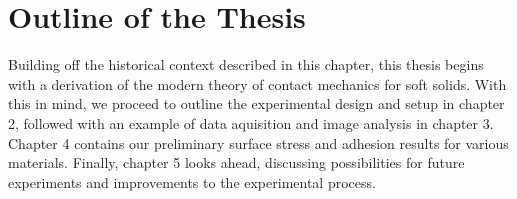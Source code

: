 \section{Outline of the Thesis}
Building off the historical context described in this chapter, 
this thesis begins with a derivation of the modern theory of contact mechanics for soft solids. With this in mind, we proceed to outline the experimental design and setup in chapter 2, followed with an example of data aquisition and image analysis in chapter 3. Chapter 4 contains our preliminary surface stress and adhesion results for various materials. Finally, chapter 5 looks ahead, discussing possibilities for future experiments and improvements to the experimental process.